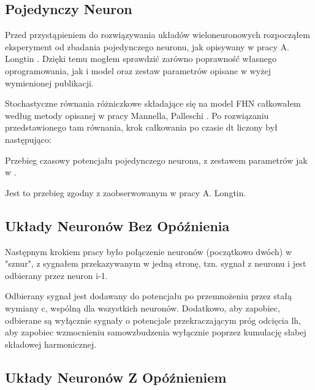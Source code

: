 \documentclass[12pt]{article}
\begin{document}
  
  
  \subsection{Pojedynczy Neuron}
  
  Przed przystąpieniem do rozwiązywania układów wieloneuronowych rozpocząłem eksperyment od zbadania pojedynczego neuronu, jak opisywany w pracy A. Longtin \cite{longtin}. Dzięki temu mogłem sprawdzić zarówno poprawność własnego oprogramowania, jak i model oraz zestaw parametrów opisane w wyżej wymienionej publikacji.
  
  Stochastyczne równania różniczkowe składające się na model FHN całkowałem według metody opisanej w pracy Mannella, Palleschi \cite{mannella}. Po rozwiązaniu przedstawionego tam równania, krok całkowania po czasie dt liczony był następująco:
  
  Przebieg czasowy potencjału pojedynczego neuronu, z zestawem parametrów jak w \cite{longtin}.
  
  
  Jest to przebieg zgodny z zaobserwowanym w pracy A. Longtin.
  
  \subsection{Układy Neuronów Bez Opóźnienia}
  
  Następnym krokiem pracy było połączenie neuronów (początkowo dwóch) w "sznur", z sygnałem przekazywanym w jedną stronę, tzn. sygnał z neuronu i jest odbierany przez neuron i-1.
  
  Odbierany sygnał jest dodawany do potencjału po przemnożeniu przez stałą wymiany c, wspólną dla wszystkich neuronów. Dodatkowo, aby zapobiec, odbierane są wyłącznie sygnały o potencjale przekraczającym próg odcięcia lh, aby zapobiec wzmocnieniu samowzbudzenia wyłącznie poprzez kumulację słabej składowej harmonicznej.
  
  \subsection{Układy Neuronów Z Opóźnieniem}
  
  
  \newpage
  
  
  
  
  
\end{document}
